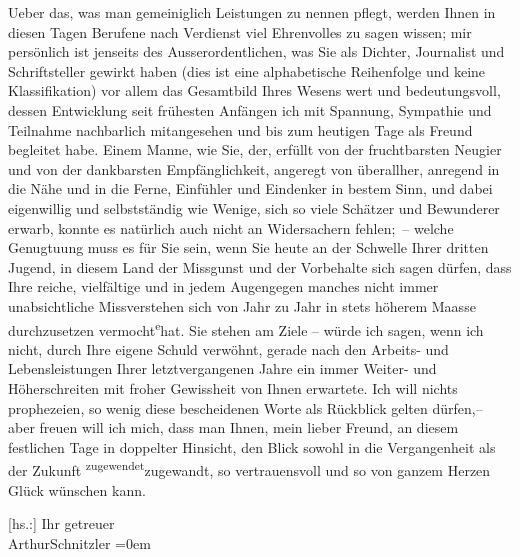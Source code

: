 \pstart
           Ueber das, was man gemeiniglich Leistungen zu nennen pflegt, werden Ihnen in diesen
               Tagen Berufene nach Verdienst viel Ehrenvolles zu sagen wissen; mir persönlich ist
                   jenseits 
               des Ausserordentlichen, was Sie als Dichter, Journalist und Schriftsteller gewirkt
               haben (dies ist eine alphabetische Reihenfolge und keine Klassifikation) {\pb}\introOben{}vor allem\introOben{} das Gesamtbild Ihres Wesens wert und
               bedeutungsvoll, dessen Entwicklung seit frühesten Anfängen ich mit Spannung,
               Sympathie und Teilnahme nachbarlich mitangesehen und bis zum heutigen Tage als Freund
               begleitet habe. Einem Manne, wie Sie, der, erfüllt von der fruchtbarsten Neugier und
               von der dankbarsten Empfänglichkeit, angeregt von überallher, anregend in die Nähe
               und in die Ferne, Einfühler und Eindenker in bestem Sinn, und dabei eigenwillig und
               selbstständig wie Wenige, sich so viele Schätzer und Bewunderer erwarb, konnte es
               natürlich auch nicht an Widersachern fehlen; – welche Genugtuung muss es für Sie sein,
               wenn Sie heute an der Schwelle Ihrer dritten Jugend, in diesem Land der Missgunst und
               der Vorbehalte sich sagen dürfen, dass Ihre reiche, vielfältige und in jedem
               Augen\label{T_L02950-1v}\label{T_L02950-1}{\pb}gegen
               manches nicht immer unabsichtliche Missverstehen sich von Jahr zu Jahr in stets
               höherem Maasse durchzusetzen vermocht\substVorne{}\textsuperscript{e}\substDazwischen{}{ }hat\substHinten{}. Sie stehen am Ziele – würde ich sagen, wenn ich nicht, durch Ihre eigene
               Schuld verwöhnt, gerade nach den Arbeits- und Lebensleistungen Ihrer letztvergangenen
               Jahre ein immer Weiter- und Höherschreiten mit froher Gewissheit von Ihnen erwartete.
               Ich will nichts prophezeien, so wenig diese bescheidenen Worte als Rückblick gelten
               dürfen,– aber freuen  will ich mich, dass man
               Ihnen, mein lieber Freund, an diesem festlichen Tage in doppelter Hinsicht, den Blick
               sowohl in die Vergangenheit als der Zukunft \substVorne{}\textsuperscript{zugewendet}\substDazwischen{}zugewandt\substHinten{}, so vertrauensvoll und so von ganzem Herzen Glück wünschen kann.\pend
           
\pstart
           {[}hs.:{]} Ihr getreuer{\\[\baselineskip]}\spacefill\mbox{ArthurSchnitzler}\pend
           \leftskip=0em{}\endnumbering{}  \newcommand{\dateiname}{L02950}\newcommand{\titel}{Arthur Schnitzler an Felix Salten, 29. 7. 1929}\newcommand{\editorInnen}{Martin Anton Müller und Laura Untner}
